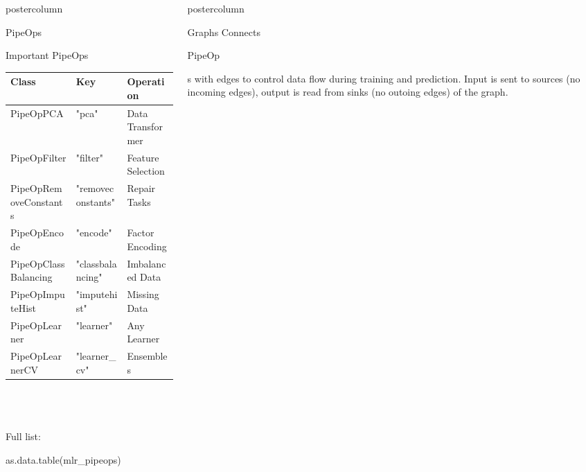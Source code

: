 \documentclass{beamer}
\newlength{\columnheight} %
\newcommand{\codeinline}[1]{\begin{codeboxinline}#1\end{codeboxinline}}
\begin{document}
\begin{frame}[fragile]{}
\begin{columns}
\begin{column}{.245\textwidth}
\begin{beamercolorbox}[center]{postercolumn}
\begin{minipage}{.98\textwidth}
{\begin{myblock}{PipeOps}
\begin{itemize}
              \end{itemize}
  			\end{myblock}
            \begin{myblock}{Important PipeOps}
              \begin{footnotesize}
                \begin{centering}
                  \begin{tabular}{l l l}
                    \textbf{Class} & \textbf{Key} & \textbf{Operation} \\ \hline
                    PipeOpPCA & "pca" & Data Transformer\\
                    PipeOpFilter & "filter" & Feature Selection\\
                    PipeOpRemoveConstants & "removeconstants" & Repair Tasks\\
                    PipeOpEncode & "encode" & Factor Encoding\\
                    PipeOpClassBalancing & "classbalancing" & Imbalanced Data\\
                    PipeOpImputeHist & "imputehist" & Missing Data\\
                    PipeOpLearner & "learner" & Any Learner\\
                    PipeOpLearnerCV & "learner\_cv" & Ensembles\\ \hline
                  \end{tabular}
                \end{centering}
              \end{footnotesize}
              \ \\
              \ \\
              \ \\
              Full list: \codeinline{as.data.table(mlr\_pipeops)}
						\end{myblock}
						\vfill}
				\end{minipage}
			\end{beamercolorbox}
		\end{column}
		\begin{column}{.245\textwidth}
			\begin{beamercolorbox}[center]{postercolumn}
				\begin{minipage}{.98\textwidth}
					\parbox[t][\columnheight]{\textwidth}{
						\begin{myblock}{Graphs}
              Connects \codeinline{PipeOp}s with edges to control data flow during training and prediction.
              Input is sent to sources (no incoming edges), output is read from sinks (no outoing edges) 
              of the graph.


\end{myblock}}
\end{minipage}
\end{beamercolorbox}
\end{column}
\end{columns}
\end{frame}
\end{document}
